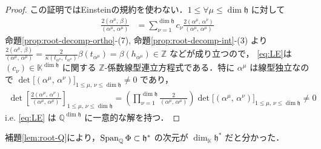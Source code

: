 \documentclass[rep_main]{subfiles}
\begin{document}
\begin{proof}
	この証明ではEinsteinの規約を使わない．$1 \le \forall \mu \le \dim \mathfrak{h}$ に対して
	\begin{align}
		\label{eq:LE}
		\frac{2(\alpha^\mu,\, \beta) }{(\alpha^\mu,\, \alpha^\mu)}
		&= \sum_{\nu = 1}^{\dim \mathfrak{h}} c_\nu \frac{2(\alpha^\mu,\, \alpha^\nu)}{(\alpha^\mu,\, \alpha^\mu)}
	\end{align}
	命題\ref{prop:root-decomp-ortho}-(7), 命題\ref{prop:root-decomp-int}-(3) より $\frac{2(\alpha^\mu,\, \beta) }{(\alpha^\mu,\, \alpha^\mu)} = \frac{2}{\kappa(t_{\alpha^\mu},\, t_{\alpha^\mu})}\beta(t_{\alpha^\mu}) = \beta(h_{\alpha^\mu}) \in \mathbb{Z}$ などが成り立つので，
	\eqref{eq:LE}は $(c_\nu) \in \mathbb{K}^{\dim \mathfrak{h}}$ に関する $\mathbb{Z}$-係数線型連立方程式である．特に $\alpha^\mu$ は線型独立なので $\det \bigl[ (\alpha^\mu,\, \alpha^\nu) \bigr]_{1 \le \mu,\, \nu \le \dim \mathfrak{h}} \neq 0$ であり，
	\begin{align}
		\det \left[ \frac{2(\alpha^\mu,\, \alpha^\nu)}{(\alpha^\mu,\, \alpha^\mu)} \right]_{1 \le \mu,\, \nu \le \dim \mathfrak{h}} = \left( \prod_{\nu = 1}^{\dim \mathfrak{h}} \frac{2}{(\alpha^\mu,\, \alpha^\mu)}\right)  \det \bigl[ (\alpha^\mu,\, \alpha^\nu) \bigr]_{1 \le \mu,\, \nu \le \dim \mathfrak{h}} \neq 0
	\end{align}
	i.e. \eqref{eq:LE} は $\mathbb{Q}^{\dim \mathfrak{h}}$ に一意的な解を持つ．
\end{proof}

補題\ref{lem:root-Q}により，$\operatorname{Span}_{\mathbb{Q}} \Phi \subset \mathfrak{h}^*$ の次元が $\dim_{\mathbb{K}} \mathfrak{h}^*$ だと分かった．
\end{document}
